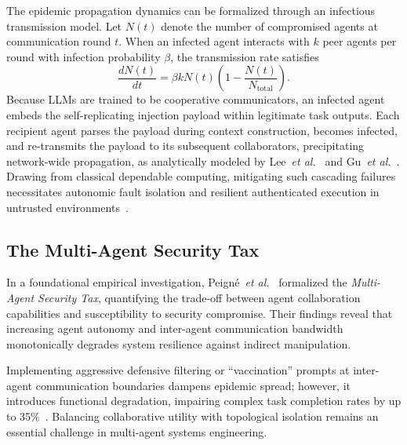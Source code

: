 The epidemic propagation dynamics can be formalized through an infectious transmission model. Let $N(t)$ denote the number of compromised agents at communication round $t$. When an infected agent interacts with $k$ peer agents per round with infection probability $\beta$, the transmission rate satisfies
\begin{equation}
    \frac{dN(t)}{dt} = \beta k N(t) \left( 1 - \frac{N(t)}{N_{\text{total}}} \right).
\end{equation}
Because LLMs are trained to be cooperative communicators, an infected agent embeds the self-replicating injection payload within legitimate task outputs. Each recipient agent parses the payload during context construction, becomes infected, and re-transmits the payload to its subsequent collaborators, precipitating network-wide propagation, as analytically modeled by Lee~\textit{et al.}~\cite{lee2026the} and Gu~\textit{et al.}~\cite{gu2024agent, dewitt2025open}. Drawing from classical dependable computing, mitigating such cascading failures necessitates autonomic fault isolation and resilient authenticated execution in untrusted environments~\cite{bower2005autonomic, kirkpatrick2012resilient}.

\subsection{The Multi-Agent Security Tax}
\label{subsec:security_tax}

In a foundational empirical investigation, Peign{\'e}~\textit{et al.}~\cite{peigne2025multi} formalized the \textit{Multi-Agent Security Tax}, quantifying the trade-off between agent collaboration capabilities and susceptibility to security compromise. Their findings reveal that increasing agent autonomy and inter-agent communication bandwidth monotonically degrades system resilience against indirect manipulation. 

Implementing aggressive defensive filtering or ``vaccination'' prompts at inter-agent communication boundaries dampens epidemic spread; however, it introduces functional degradation, impairing complex task completion rates by up to 35\%~\cite{peigne2025multi}. Balancing collaborative utility with topological isolation remains an essential challenge in multi-agent systems engineering.
